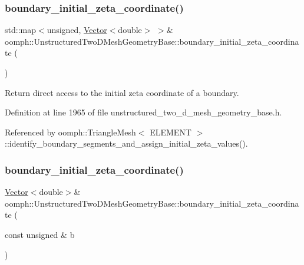 \subsubsection{\texorpdfstring{boundary\+\_\+initial\+\_\+zeta\+\_\+coordinate()}{boundary\_initial\_zeta\_coordinate()}\hspace{0.1cm}{\footnotesize\ttfamily [1/2]}}
{\footnotesize\ttfamily std\+::map$<$unsigned, \hyperlink{classoomph_1_1Vector}{Vector}$<$double$>$ $>$\& oomph\+::\+Unstructured\+Two\+D\+Mesh\+Geometry\+Base\+::boundary\+\_\+initial\+\_\+zeta\+\_\+coordinate (\begin{DoxyParamCaption}{ }\end{DoxyParamCaption})\hspace{0.3cm}{\ttfamily [inline]}}



Return direct access to the initial zeta coordinate of a boundary. 



Definition at line 1965 of file unstructured\+\_\+two\+\_\+d\+\_\+mesh\+\_\+geometry\+\_\+base.\+h.



Referenced by oomph\+::\+Triangle\+Mesh$<$ E\+L\+E\+M\+E\+N\+T $>$\+::identify\+\_\+boundary\+\_\+segments\+\_\+and\+\_\+assign\+\_\+initial\+\_\+zeta\+\_\+values().

\mbox{\label{classoomph_1_1UnstructuredTwoDMeshGeometryBase_ab631fe3d2b7f0d4ac7155d0636db7c3b}} 
\subsubsection{\texorpdfstring{boundary\+\_\+initial\+\_\+zeta\+\_\+coordinate()}{boundary\_initial\_zeta\_coordinate()}\hspace{0.1cm}{\footnotesize\ttfamily [2/2]}}
{\footnotesize\ttfamily \hyperlink{classoomph_1_1Vector}{Vector}$<$double$>$\& oomph\+::\+Unstructured\+Two\+D\+Mesh\+Geometry\+Base\+::boundary\+\_\+initial\+\_\+zeta\+\_\+coordinate (\begin{DoxyParamCaption}\item[{const unsigned \&}]{b }\end{DoxyParamCaption})\hspace{0.3cm}{\ttfamily [inline]}}



